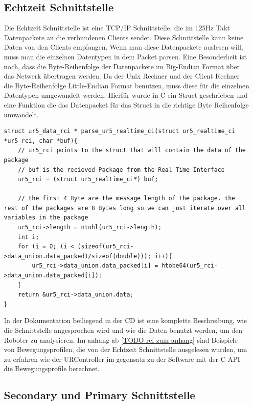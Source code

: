 \subsection{Echtzeit Schnittstelle}
\label{urcontrol_rci_gru}

Die Echtzeit Schnittstelle ist eine \ac{TCP/IP} Schnittstelle, die im 125Hz Takt Datenpackete an die verbundenen Clients sendet. Diese Schnittstelle kann keine Daten von den Clients empfangen. Wenn man diese Datenpackete auslesen will, muss man die einzelnen Datentypen in dem Packet \ac{parsen}. Eine Besonderheit ist noch, dass die Byte-Reihenfolge der Datenpackete im \ac{Big-Endian Format} über das Netwerk übertragen werden. Da der Unix Rechner und der Client Rechner die Byte-Reihenfolge \ac{Little-Endian Format} benutzen, muss diese für die einzelnen Datentypen umgewandelt werden. Hierfür wurde in C ein Struct geschrieben und eine Funktion die das Datenpacket für das Struct in die richtige Byte Reihenfolge umwandelt.

\begin{lstlisting}[caption={Umwandlung der Byte-Order für Packet über die Echtzeit-Schnittstellen }, label=lst:rci_parse ,captionpos=b]
struct ur5_data_rci * parse_ur5_realtime_ci(struct ur5_realtime_ci *ur5_rci, char *buf){
    // ur5_rci points to the struct that will contain the data of the package
    // buf is the recieved Package from the Real Time Interface
    ur5_rci = (struct ur5_realtime_ci*) buf;

    // the first 4 Byte are the message length of the package. the rest of the packages are 8 Bytes long so we can just iterate over all variables in the package 
    ur5_rci->length = ntohl(ur5_rci->length);
    int i;
    for (i = 0; (i < (sizeof(ur5_rci->data_union.data_packed)/sizeof(double))); i++){
        ur5_rci->data_union.data_packed[i] = htobe64(ur5_rci->data_union.data_packed[i]);
    }
    return &ur5_rci->data_union.data;
}
\end{lstlisting}

In der Dokumentation beiliegend in der CD ist eine komplette Beschreibung, wie die Schnittstelle angesprochen wird und wie die Daten benutzt werden, um den Roboter zu analysieren. Im anhang ab \ref{TODO ref zum anhang} sind Beispiele von Bewegungsprofilen, die von der Echtzeit Schnittstelle ausgelesen wurden, um zu erfahren wie der URController im gegensatz zu der Software mit der C-API die Bewegungsprofile berechnet.

\subsection{Secondary und Primary Schnittstelle}
\label{urcontrol_spi_gru}

